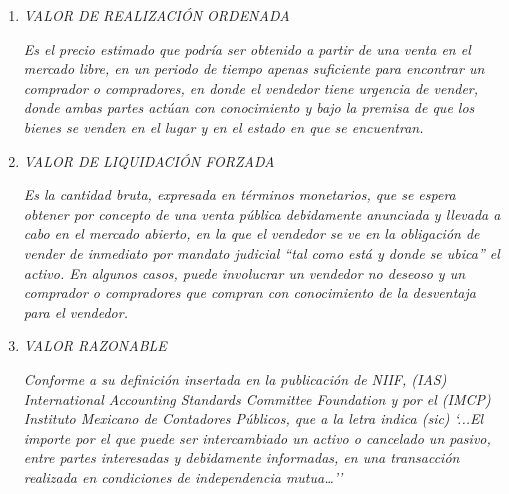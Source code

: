 \begin{enumerate}
\textit{Es el importe con que un rengl\'on contable aparece registrado en los libros de contabilidad, ya sea que represente el costo, inicial, el actualizado, el estimado o el de aval\'uo. Representa el valor con que se registra en los libros de contabilidad cualquier propiedad, derecho, bien, cr\'edito u obligaci\'on. El valor en libros representa \'unicamente ``cifras en libros'' y eso puede ser diferente del valor comercial, del valor en el mercado, del valor real, del valor de reposici\'on, del valor de liquidaci\'on, etc.}\\

\item \textcolor{principal}{\textit{VALOR DE REALIZACI\'ON ORDENADA}}

\textit{Es el precio estimado que podr\'ia ser obtenido a partir de una venta en el mercado libre, en un periodo de tiempo apenas suficiente para encontrar un comprador o compradores, en donde el vendedor tiene urgencia de vender, donde ambas partes act\'uan con conocimiento y bajo la premisa de que los bienes se venden en el lugar y en el estado en que se encuentran.}

\item \textcolor{principal}{ \textit{VALOR DE LIQUIDACI\'ON FORZADA}}

\textit{Es la cantidad bruta, expresada en t\'erminos monetarios, que se espera obtener por concepto de una venta p\'ublica debidamente anunciada y llevada a cabo en el mercado abierto, en la que el vendedor se ve en la obligaci\'on de vender de inmediato por mandato judicial ``tal como est\'a y donde se ubica'' el activo. En algunos casos, puede involucrar un vendedor no deseoso y un comprador o compradores que compran con conocimiento de la desventaja para el vendedor.}

\item \textcolor{principal}{ \textit{VALOR RAZONABLE}}

\textit{Conforme a su definici\'on insertada en la publicaci\'on de NIIF, (IAS) International Accounting Standards Committee Foundation y por el (IMCP) Instituto Mexicano de Contadores P\'ublicos, que a la letra indica (sic)  `...El importe por el que puede ser intercambiado un activo o cancelado un pasivo, entre partes interesadas y debidamente informadas, en una transacción realizada en condiciones de independencia mutua…''}

\end{enumerate}
